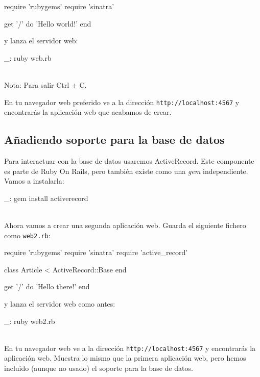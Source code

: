\begin{rubycode}
require 'rubygems'
require 'sinatra'

get '/' do
  'Hello world!'
end
\end{rubycode}

y lanza el servidor web:

\begin{bashcode}
_: ruby web.rb
\end{bashcode}
\\

Nota: Para salir Ctrl + C.

En tu navegador web preferido ve a la dirección \texttt{http://localhost:4567} y encontrarás la aplicación web que acabamos de crear.


\subsection{Añadiendo soporte para la base de datos}

Para interactuar con la base de datos usaremos ActiveRecord. Este componente es parte de Ruby On Rails, pero también existe como una \emph{gem} independiente. Vamos a instalarla:

\begin{bashcode}
_: gem install activerecord
\end{bashcode}
\\

Ahora vamos a crear una segunda aplicación web. Guarda el siguiente fichero como \texttt{web2.rb}:

\begin{rubycode}
require 'rubygems'
require 'sinatra'
require 'active_record'

class Article < ActiveRecord::Base
end

get '/' do
   'Hello there!'
end
\end{rubycode}

y lanza el servidor web como antes:

\begin{bashcode}
_: ruby web2.rb
\end{bashcode}
\\

En tu navegador web ve a la dirección \texttt{http://localhost:4567} y encontrarás la aplicación web. Muestra lo mismo que la primera aplicación web, pero hemos incluido (aunque no usado) el soporte para la base de datos.



